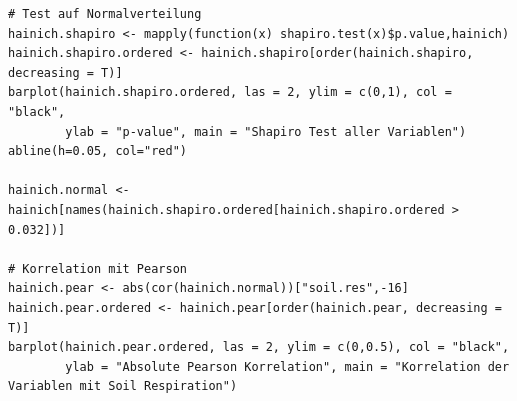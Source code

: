 \begin{lstlisting}
# Test auf Normalverteilung
hainich.shapiro <- mapply(function(x) shapiro.test(x)$p.value,hainich)
hainich.shapiro.ordered <- hainich.shapiro[order(hainich.shapiro, decreasing = T)]
barplot(hainich.shapiro.ordered, las = 2, ylim = c(0,1), col = "black",
        ylab = "p-value", main = "Shapiro Test aller Variablen")
abline(h=0.05, col="red")

hainich.normal <- hainich[names(hainich.shapiro.ordered[hainich.shapiro.ordered > 0.032])]

# Korrelation mit Pearson
hainich.pear <- abs(cor(hainich.normal))["soil.res",-16]
hainich.pear.ordered <- hainich.pear[order(hainich.pear, decreasing = T)]
barplot(hainich.pear.ordered, las = 2, ylim = c(0,0.5), col = "black",
        ylab = "Absolute Pearson Korrelation", main = "Korrelation der Variablen mit Soil Respiration")
\end{lstlisting}
